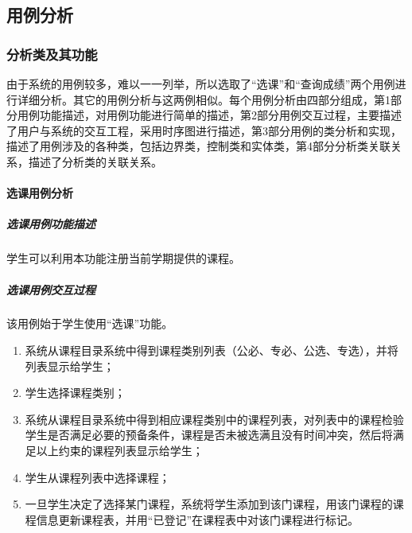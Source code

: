 \subsection{用例分析}
\subsubsection{分析类及其功能}
由于系统的用例较多，难以一一列举，所以选取了“选课”和“查询成绩”两个用例进行详细分析。其它的用例分析与这两例相似。每个用例分析由四部分组成，第1部分用例功能描述，对用例功能进行简单的描述，第2部分用例交互过程，主要描述了用户与系统的交互工程，采用时序图进行描述，第3部分用例的类分析和实现，描述了用例涉及的各种类，包括边界类，控制类和实体类，第4部分分析类关联关系，描述了分析类的关联关系。

\paragraph{选课用例分析}
\subparagraph{选课用例功能描述}
学生可以利用本功能注册当前学期提供的课程。

\subparagraph{选课用例交互过程}
    
该用例始于学生使用“选课”功能。
    
\begin{enumerate}
  \item 系统从课程目录系统中得到课程类别列表（公必、专必、公选、专选），并将列表显示给学生；
  \item 学生选择课程类别；
  \item 系统从课程目录系统中得到相应课程类别中的课程列表，对列表中的课程检验学生是否满足必要的预备条件，课程是否未被选满且没有时间冲突，然后将满足以上约束的课程列表显示给学生；
  \item 学生从课程列表中选择课程；
  \item 一旦学生决定了选择某门课程，系统将学生添加到该门课程，用该门课程的课程信息更新课程表，并用“已登记”在课程表中对该门课程进行标记。
\end{enumerate}
    
